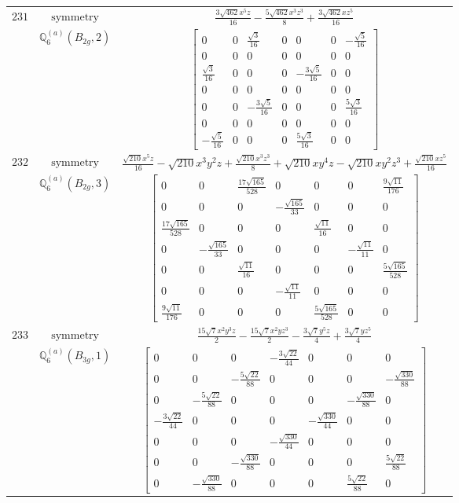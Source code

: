 \documentclass[fleqn,8pt,landscape]{jsarticle}
\begin{document}
\begin{longtable}{ccc}
$ 231 $ & $ \text{symmetry} $ & $ \frac{3 \sqrt{462} x^{5} z}{16} - \frac{5 \sqrt{462} x^{3} z^{3}}{8} + \frac{3 \sqrt{462} x z^{5}}{16} $ \\
$  $ & $ \mathbb{Q}_{6}^{(a)}(B_{2g},2) $ & $ \begin{bmatrix} 0 & 0 & \frac{\sqrt{3}}{16} & 0 & 0 & 0 & - \frac{\sqrt{5}}{16} \\ 0 & 0 & 0 & 0 & 0 & 0 & 0 \\ \frac{\sqrt{3}}{16} & 0 & 0 & 0 & - \frac{3 \sqrt{5}}{16} & 0 & 0 \\ 0 & 0 & 0 & 0 & 0 & 0 & 0 \\ 0 & 0 & - \frac{3 \sqrt{5}}{16} & 0 & 0 & 0 & \frac{5 \sqrt{3}}{16} \\ 0 & 0 & 0 & 0 & 0 & 0 & 0 \\ - \frac{\sqrt{5}}{16} & 0 & 0 & 0 & \frac{5 \sqrt{3}}{16} & 0 & 0 \end{bmatrix} $ \\ \hline
$ 232 $ & $ \text{symmetry} $ & $ \frac{\sqrt{210} x^{5} z}{16} - \sqrt{210} x^{3} y^{2} z + \frac{\sqrt{210} x^{3} z^{3}}{8} + \sqrt{210} x y^{4} z - \sqrt{210} x y^{2} z^{3} + \frac{\sqrt{210} x z^{5}}{16} $ \\
$  $ & $ \mathbb{Q}_{6}^{(a)}(B_{2g},3) $ & $ \begin{bmatrix} 0 & 0 & \frac{17 \sqrt{165}}{528} & 0 & 0 & 0 & \frac{9 \sqrt{11}}{176} \\ 0 & 0 & 0 & - \frac{\sqrt{165}}{33} & 0 & 0 & 0 \\ \frac{17 \sqrt{165}}{528} & 0 & 0 & 0 & \frac{\sqrt{11}}{16} & 0 & 0 \\ 0 & - \frac{\sqrt{165}}{33} & 0 & 0 & 0 & - \frac{\sqrt{11}}{11} & 0 \\ 0 & 0 & \frac{\sqrt{11}}{16} & 0 & 0 & 0 & \frac{5 \sqrt{165}}{528} \\ 0 & 0 & 0 & - \frac{\sqrt{11}}{11} & 0 & 0 & 0 \\ \frac{9 \sqrt{11}}{176} & 0 & 0 & 0 & \frac{5 \sqrt{165}}{528} & 0 & 0 \end{bmatrix} $ \\ \hline
$ 233 $ & $ \text{symmetry} $ & $ \frac{15 \sqrt{7} x^{2} y^{3} z}{2} - \frac{15 \sqrt{7} x^{2} y z^{3}}{2} - \frac{3 \sqrt{7} y^{5} z}{4} + \frac{3 \sqrt{7} y z^{5}}{4} $ \\
$  $ & $ \mathbb{Q}_{6}^{(a)}(B_{3g},1) $ & $ \begin{bmatrix} 0 & 0 & 0 & - \frac{3 \sqrt{22}}{44} & 0 & 0 & 0 \\ 0 & 0 & - \frac{5 \sqrt{22}}{88} & 0 & 0 & 0 & - \frac{\sqrt{330}}{88} \\ 0 & - \frac{5 \sqrt{22}}{88} & 0 & 0 & 0 & - \frac{\sqrt{330}}{88} & 0 \\ - \frac{3 \sqrt{22}}{44} & 0 & 0 & 0 & - \frac{\sqrt{330}}{44} & 0 & 0 \\ 0 & 0 & 0 & - \frac{\sqrt{330}}{44} & 0 & 0 & 0 \\ 0 & 0 & - \frac{\sqrt{330}}{88} & 0 & 0 & 0 & \frac{5 \sqrt{22}}{88} \\ 0 & - \frac{\sqrt{330}}{88} & 0 & 0 & 0 & \frac{5 \sqrt{22}}{88} & 0 \end{bmatrix} $ \\ \hline

\end{longtable}
\end{document}
